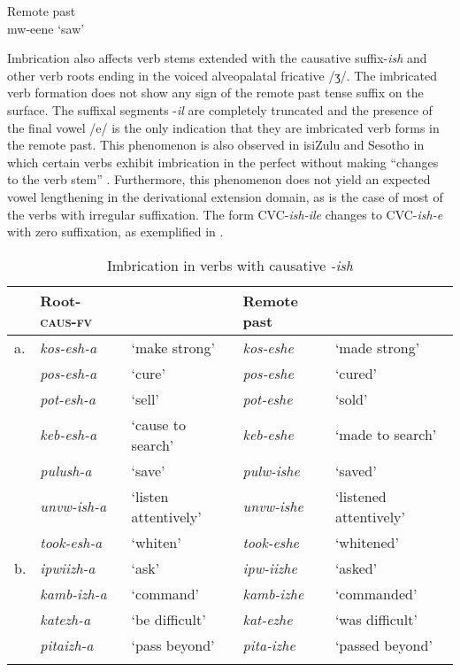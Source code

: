 \documentclass[output=paper]{langsci/langscibook}
\begin{document}
   \ex\label{ex:8b.kawasha} Remote past \\
     mw-eene ‘saw’ \\
\z
\z 

Imbrication also affects verb stems extended with the causative suffix-\textit{ish} and other verb roots ending in the voiced alveopalatal fricative /ʒ/. The imbricated verb formation does not show any sign of the remote past tense suffix on the surface. The suffixal segments -\textit{il} are completely truncated and the presence of the final vowel /e/ is the only indication that they are imbricated verb forms in the remote past. This phenomenon is also observed in isiZulu and Sesotho in which certain verbs exhibit imbrication in the perfect without making “changes to the verb stem” \citep{monich2015}. Furthermore, this phenomenon does not yield an expected vowel lengthening in the derivational extension domain, as is the case of most of the verbs with irregular suffixation. The form CVC-\textit{ish-ile} changes to CVC-\textit{ish-e} with zero suffixation, as exemplified in .

\begin{table}
\begin{tabularx}{\textwidth}{llXll}
\lsptoprule
 & Root-\textsc{caus}-\textsc{fv} &  & Remote past & \\
\midrule
a. & \textit{kos-esh-a} & `make strong' & \textit{kos-eshe} & `made strong' \\
 & \textit{pos-esh-a} & `cure' & \textit{pos-eshe} & `cured' \\
 & \textit{pot-esh-a} & `sell' & \textit{pot-eshe} & `sold' \\
 & \textit{keb-esh-a} & `cause to search' & \textit{keb-eshe} & `made to search' \\
 & \textit{pulush-a} & `save' & \textit{pulw-ishe} & `saved' \\
 & \textit{unvw-ish-a} & `listen attentively' & \textit{unvw-ishe} & `listened attentively' \\
 & \textit{took-esh-a} & `whiten' & \textit{took-eshe} & `whitened' \\
\tablevspace
b. & \textit{ipwiizh-a} & `ask' & \textit{ipw-iizhe} & `asked' \\
 & \textit{kamb-izh-a} & `command' & \textit{kamb-izhe} & `commanded' \\
 & \textit{katezh-a} & `be difficult' & \textit{kat-ezhe} & `was difficult' \\
 & \textit{pitaizh-a} & `pass beyond' & \textit{pita-izhe} & `passed beyond' \\

\lspbottomrule
\end{tabularx}

\caption{Imbrication in verbs with causative \textit{-ish}}
\label{tab:24.kawasha}

\end{table}
\end{document}
